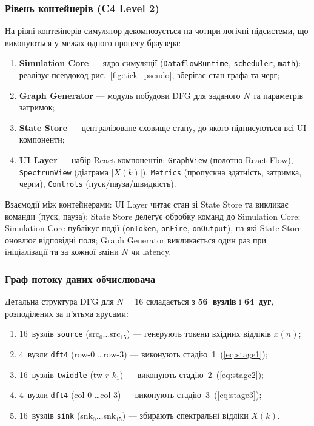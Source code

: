 \subsubsection*{Рівень контейнерів (C4 Level 2)}

На рівні контейнерів симулятор декомпозується на чотири логічні
підсистеми, що виконуються у межах одного процесу браузера:

\begin{enumerate}
  \item \textbf{Simulation Core} --- ядро симуляції (\texttt{DataflowRuntime},
        \texttt{scheduler}, \texttt{math}): реалізує псевдокод
        рис.~\ref{fig:tick_pseudo}, зберігає стан графа та черг;
  \item \textbf{Graph Generator} --- модуль побудови DFG для заданого
        $N$ та параметрів затримок;
  \item \textbf{State Store} --- централізоване сховище стану, до
        якого підписуються всі UI-компоненти;
  \item \textbf{UI Layer} --- набір React-компонентів:
        \texttt{GraphView} (полотно React Flow), \texttt{SpectrumView}
        (діаграма $|X(k)|$), \texttt{Metrics} (пропускна здатність,
        затримка, черги), \texttt{Controls} (пуск/пауза/швидкість).
\end{enumerate}

Взаємодії між контейнерами: UI Layer читає стан зі State Store та
викликає команди (пуск, пауза); State Store делегує обробку команд
до Simulation Core; Simulation Core публікує події
(\texttt{onToken}, \texttt{onFire}, \texttt{onOutput}), на які
State Store оновлює відповідні поля; Graph Generator викликається
один раз при ініціалізації та за кожної зміни $N$ чи latency.

\subsubsection*{Граф потоку даних обчислювача}

Детальна структура DFG для $N = 16$ складається з \textbf{56~вузлів}
і \textbf{64~дуг}, розподілених за п'ятьма ярусами:

\begin{enumerate}
  \item 16~вузлів \texttt{source} (src$_0 \ldots$src$_{15}$) ---
        генерують токени вхідних відліків $x(n)$;
  \item 4~вузли \texttt{dft4} (row-0 \ldots row-3) --- виконують
        стадію~1~(\ref{eq:stage1});
  \item 16~вузлів \texttt{twiddle} (tw-$r$-$k_1$) --- виконують
        стадію~2~(\ref{eq:stage2});
  \item 4~вузли \texttt{dft4} (col-0 \ldots col-3) --- виконують
        стадію~3~(\ref{eq:stage3});
  \item 16~вузлів \texttt{sink} (snk$_0 \ldots$snk$_{15}$) ---
        збирають спектральні відліки $X(k)$.
\end{enumerate}

